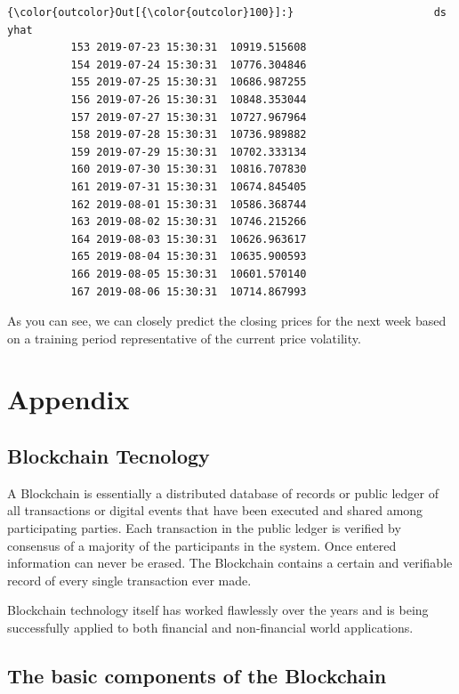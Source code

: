 \documentclass[11pt]{article}
\begin{document}
\begin{Verbatim}[commandchars=\\\{\}]
{\color{outcolor}Out[{\color{outcolor}100}]:}                      ds          yhat
          153 2019-07-23 15:30:31  10919.515608
          154 2019-07-24 15:30:31  10776.304846
          155 2019-07-25 15:30:31  10686.987255
          156 2019-07-26 15:30:31  10848.353044
          157 2019-07-27 15:30:31  10727.967964
          158 2019-07-28 15:30:31  10736.989882
          159 2019-07-29 15:30:31  10702.333134
          160 2019-07-30 15:30:31  10816.707830
          161 2019-07-31 15:30:31  10674.845405
          162 2019-08-01 15:30:31  10586.368744
          163 2019-08-02 15:30:31  10746.215266
          164 2019-08-03 15:30:31  10626.963617
          165 2019-08-04 15:30:31  10635.900593
          166 2019-08-05 15:30:31  10601.570140
          167 2019-08-06 15:30:31  10714.867993
\end{Verbatim}
            
    As you can see, we can closely predict the closing prices for the next
week based on a training period representative of the current price
volatility.

    \hypertarget{appendix}{%
\section{Appendix}\label{appendix}}

    \hypertarget{blockchain-tecnology}{%
\subsection{Blockchain Tecnology}\label{blockchain-tecnology}}

    A Blockchain is essentially a distributed database of records or public
ledger of all transactions or digital events that have been executed and
shared among participating parties. Each transaction in the public
ledger is verified by consensus of a majority of the participants in the
system. Once entered information can never be erased. The Blockchain
contains a certain and verifiable record of every single transaction
ever made.

    Blockchain technology itself has worked flawlessly over the years and is
being successfully applied to both financial and non-financial world
applications.

    \hypertarget{the-basic-components-of-the-blockchain}{%
\subsection{The basic components of the
Blockchain}\label{the-basic-components-of-the-blockchain}}
\end{document}
